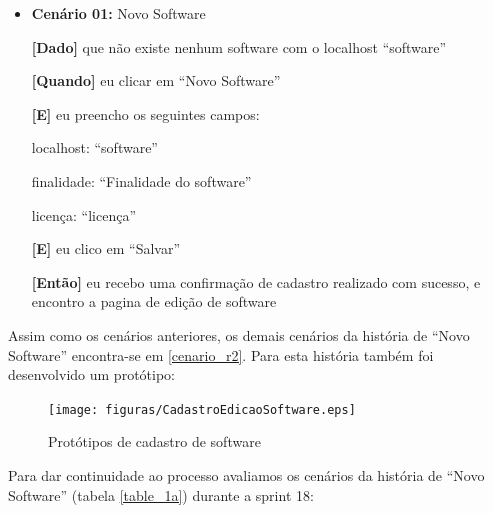 \begin{itemize}
\item\textbf{Cenário 01:} Novo Software

	\textbf{[Dado]} que não existe nenhum software com o localhost ``software''

	\textbf{[Quando]} eu clicar em ``Novo Software''

	\textbf{[E]} eu preencho os seguintes campos: 

  		\subitem localhost: ``software''

  		\subitem finalidade: ``Finalidade do software''

  		\subitem licença: ``licença''
  		
  		
	\textbf{[E]} eu clico em ``Salvar''

	\textbf{[Então]} eu recebo uma confirmação de cadastro realizado com sucesso, e encontro a pagina de edição de software
\end{itemize}
Assim como os cenários anteriores, os demais cenários da história de ``Novo Software'' encontra-se em \ref{cenario_r2}. Para esta história também foi desenvolvido um protótipo:

	\begin{figure}[h!]
    	\centering
    	\texttt{[image: figuras/CadastroEdicaoSoftware.eps]}
    	\caption{Protótipos de cadastro de software}
    	\label{cadastro software}
	\end{figure}


Para dar continuidade ao processo avaliamos os cenários da história de ``Novo Software'' (tabela \ref{table_1a}) durante a sprint 18: 

